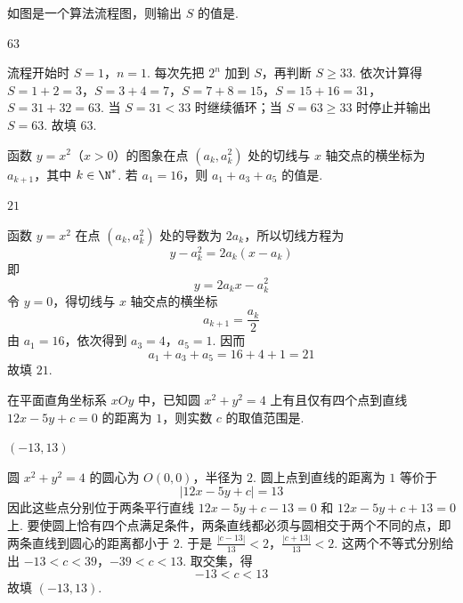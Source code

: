 \begin{problem}
如图是一个算法流程图，则输出 \(S\) 的值是\fillinblank{}.

\end{problem}

\begin{answer}
\(63\)
\end{answer}

\begin{solution}
流程开始时 \(S=1\)，\(n=1\). 每次先把 \(2^n\) 加到 \(S\)，再判断 \(S\geqslant33\). 依次计算得 \(S=1+2=3\)，\(S=3+4=7\)，\(S=7+8=15\)，\(S=15+16=31\)，\(S=31+32=63\).
当 \(S=31<33\) 时继续循环；当 \(S=63\geqslant33\) 时停止并输出 \(S=63\). 故填 \(63\).
\end{solution}

\begin{problem}
函数 \(y=x^2\)（\(x>0\)）的图象在点 \(\left(a_k,a_k^2\right)\) 处的切线与 \(x\) 轴交点的横坐标为 \(a_{k+1}\)，其中 \(k\in\N^*\). 若 \(a_1=16\)，则 \(a_1+a_3+a_5\) 的值是\fillinblank{}.
\end{problem}

\begin{answer}
\(21\)
\end{answer}

\begin{solution}
函数 \(y=x^2\) 在点 \((a_k,a_k^2)\) 处的导数为 \(2a_k\)，所以切线方程为
\[
y-a_k^2=2a_k(x-a_k)
\]
即
\[
y=2a_kx-a_k^2
\]
令 \(y=0\)，得切线与 \(x\) 轴交点的横坐标
\[
a_{k+1}=\frac{a_k}{2}
\]
由 \(a_1=16\)，依次得到 \(a_3=4\)，\(a_5=1\). 因而
\[
a_1+a_3+a_5=16+4+1=21
\]
故填 \(21\).
\end{solution}

\begin{problem}
在平面直角坐标系 \(xOy\) 中，已知圆 \(x^2+y^2=4\) 上有且仅有四个点到直线 \(12x-5y+c=0\) 的距离为 \(1\)，则实数 \(c\) 的取值范围是\fillinblank{}.
\end{problem}

\begin{answer}
\((-13,13)\)
\end{answer}

\begin{solution}
圆 \(x^2+y^2=4\) 的圆心为 \(O(0,0)\)，半径为 \(2\). 圆上点到直线的距离为 \(1\) 等价于
\[
|12x-5y+c|=13
\]
因此这些点分别位于两条平行直线 \(12x-5y+c-13=0\) 和 \(12x-5y+c+13=0\) 上. 要使圆上恰有四个点满足条件，两条直线都必须与圆相交于两个不同的点，即两条直线到圆心的距离都小于 \(2\). 于是
\(\frac{|c-13|}{13}<2\)，\(\frac{|c+13|}{13}<2\).
这两个不等式分别给出 \(-13<c<39\)，\(-39<c<13\).
取交集，得
\[
-13<c<13
\]
故填 \((-13,13)\).
\end{solution}

